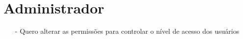 \documentclass[12pt,a4paper]{report}
\begin{document}
\section{Administrador}
\begin{itemize}
\item[-] Quero alterar as permissões para controlar o nível de acesso dos usuários
\end{itemize}
%
\end{document}
